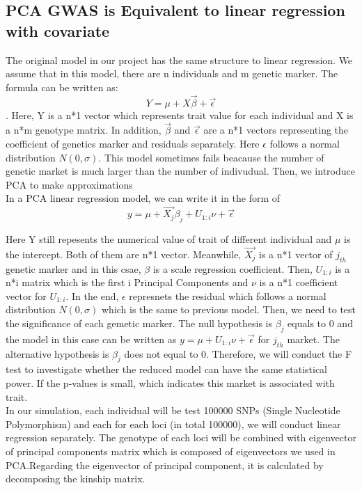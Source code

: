 \documentclass[12pt]{article}
\begin{document}
\subsection{PCA GWAS  is Equivalent to linear regression with covariate}
The original model in our project has the same structure to linear regression. We assume that in this model, there are n individuals and m genetic marker. The formula can be written as: $$Y=\mu+X \vec{\beta}+\vec{\epsilon}$$. Here, Y is a n*1 vector which represents trait value for each individual and X is a n*m genotype matrix. In addition, $\vec{\beta}$ and $\vec{\epsilon}$ are a n*1 vectors representing the coefficient of genetics marker and residuals separately. Here $\epsilon$ follows a normal distribution $N(0,\sigma)$. This model sometimes fails beacause the number of genetic market is much larger than the number of indivudual. Then, we introduce PCA to make approximations\\

In a PCA linear regression model, we can write it in the form of $$y=\mu+ \vec{X_{j}} {\beta}_{j}+U_{1:i} \nu+\vec{\epsilon}$$

Here Y still repesents the numerical value of trait of different individual and $\mu$ is the intercept. Both of them are n*1 vector. Meanwhile, $\vec{X_{j}}$ is a n*1 vector of $j_{th}$ genetic marker and in this csae, $\beta$ is a scale regression coefficient. Then, $U_{1:i}$ is a n*i matrix which is the first i Principal Components and $\nu$ is a n*1 coefficient vector for $U_{1:i}$. In the end, $\epsilon$ represnets the residual which follows a normal distribution $N(0,\sigma)$ which is the same to previous model. Then, we need to test the significance of each gemetic marker. The null hypothesis is ${\beta}_{j}$ equals to 0 and the model in this case can be written as $y=\mu+U_{1:i} \nu+\vec{\epsilon}$ for $j_{th}$ market. The alternative hypothesis is ${\beta}_{j}$ does not equal to 0. Therefore, we will conduct the F test to investigate whether the reduced model can have the same statistical power. If the p-values is small, which indicates this market is associated with trait.\\

In our simulation, each individual will be test 100000 SNPs (Single Nucleotide Polymorphism) and each for each loci (in total 100000), we will conduct linear regression separately.  The genotype of each loci will be combined with eigenvector of principal components matrix which is composed of eigenvectors we used in PCA.Regarding the eigenvector of principal component, it is calculated by decomposing the kinship matrix.  
\end{document}
